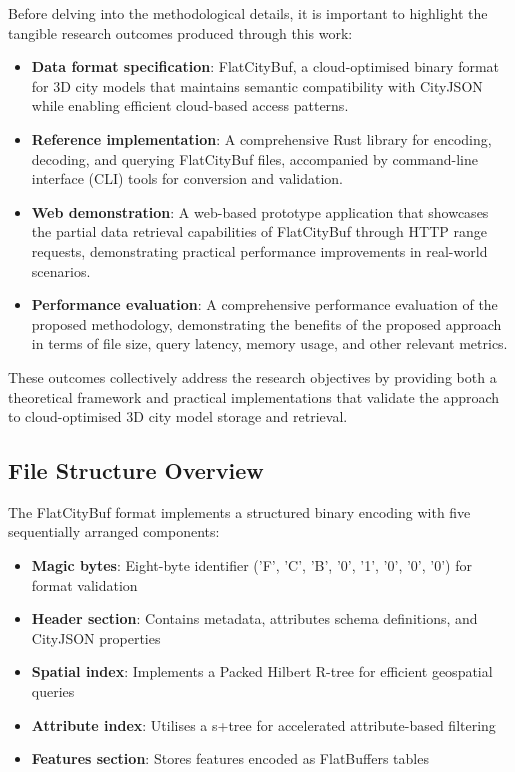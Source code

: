 Before delving into the methodological details, it is important to highlight the tangible research outcomes produced through this work:

\begin{itemize}
  \item \textbf{Data format specification}: FlatCityBuf, a cloud-optimised binary format for 3D city models that maintains semantic compatibility with CityJSON while enabling efficient cloud-based access patterns.

  \item \textbf{Reference implementation}: A comprehensive Rust library for encoding, decoding, and querying FlatCityBuf files, accompanied by command-line interface (CLI) tools for conversion and validation.

  \item \textbf{Web demonstration}: A web-based prototype application that showcases the partial data retrieval capabilities of FlatCityBuf through HTTP range requests, demonstrating practical performance improvements in real-world scenarios.

  \item \textbf{Performance evaluation}: A comprehensive performance evaluation of the proposed methodology, demonstrating the benefits of the proposed approach in terms of file size, query latency, memory usage, and other relevant metrics.
\end{itemize}

These outcomes collectively address the research objectives by providing both a theoretical framework and practical implementations that validate the approach to cloud-optimised 3D city model storage and retrieval.

\subsection{File Structure Overview}
\label{methodology:overview:file_structure}

The FlatCityBuf format implements a structured binary encoding with five sequentially arranged components:

\begin{itemize}
  \item \textbf{Magic bytes}: Eight-byte identifier ('F', 'C', 'B', '0', '1', '0', '0', '0') for format validation
  \item \textbf{Header section}: Contains metadata, attributes schema definitions, and CityJSON properties
  \item \textbf{Spatial index}: Implements a Packed Hilbert R-tree \citep{Kamel_Faloutsos_1993} for efficient geospatial queries
  \item \textbf{Attribute index}: Utilises a \ac{s+tree} for accelerated attribute-based filtering
  \item \textbf{Features section}: Stores features encoded as FlatBuffers tables
\end{itemize}

